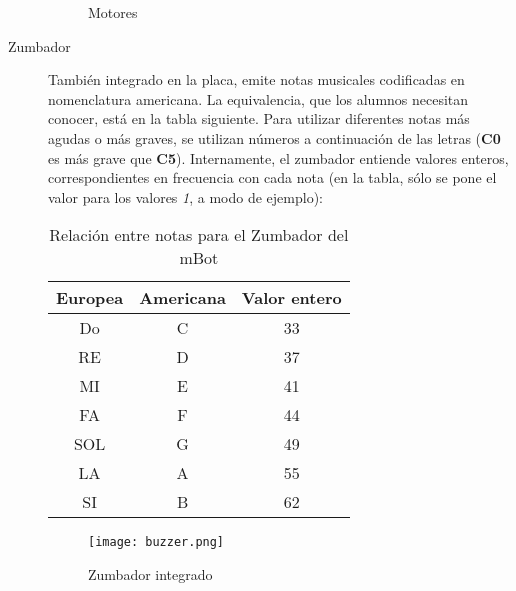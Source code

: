 \begin{description}
		\begin{figure}[H]
			\begin{center}
				\begin{subfigure}
					[Puerto de conexión de los motores]{
						\texttt{[image: puertomotor.png]}
						\label{img:puertomotor}}
				\end{subfigure}
				\begin{subfigure}
					[Motor DC]{			
						\texttt{[image: motorDC2.png]}
						\label{img:motor1}}
				\end{subfigure}
				\begin{subfigure}
					[Motor DC: montaje con rueda]{			
						\texttt{[image: motorDC.png]}
						\label{img:motor2}}
				\end{subfigure}
				\label{img:motores}
				\caption{Motores}
			\end{center}
		\end{figure}
	
	\item [Zumbador] También integrado en la placa, emite notas musicales codificadas en nomenclatura americana. La equivalencia, que los alumnos necesitan conocer, está en la tabla siguiente. Para utilizar diferentes notas más agudas o más graves, se utilizan números a continuación de las letras (\textbf{C0} es más grave que \textbf{C5}). Internamente, el zumbador entiende valores enteros, correspondientes en frecuencia con cada nota (en la tabla, sólo se pone el valor para los valores \textit{1}, a modo de ejemplo):
	\begin{table}[h]
		\centering
		\begin{tabular}{ c | c | c}	
			Europea & Americana & Valor entero \\
			\hline			
			Do & C & 33\\
			RE & D & 37\\
			MI & E & 41\\
			FA & F & 44\\
			SOL & G & 49\\
			LA & A & 55\\
			SI & B & 62\\
		\end{tabular}
	\label{table:notasZumbador}
	\caption{Relación entre notas para el Zumbador del mBot}
	\end{table}

	
	\begin{figure}[H]
		\texttt{[image: buzzer.png]}
		\centering
		\label{img:zumbador}
		\caption{Zumbador integrado}
	\end{figure}
\end{description}



